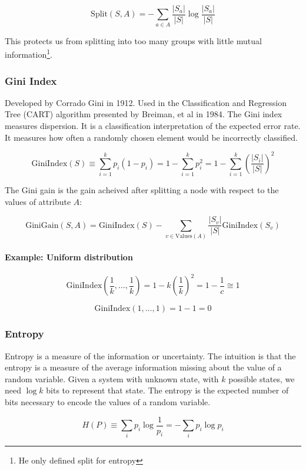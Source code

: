 \documentclass{idc_msc}
\begin{document}
\[\text{Split}(S,A) = - \sum_{a \in A} \frac{|S_a|}{|S|} \log \frac{|S_a|}{|S|}\]

This protects us from splitting into too many groups with little mutual information\footnote{He only defined split for entropy}.

\subsubsection{Gini Index}

Developed by Corrado Gini in 1912.
Used in the Classification and Regression Tree (CART) algorithm presented by Breiman, et al in 1984.
The Gini index measures dispersion.
It is a classification interpretation of the expected error rate.
It measures how often a randomly chosen element would be incorrectly classified.

\[\text{GiniIndex}(S) \equiv \sum_{i=1}^k p_i(1-p_i) = 1 - \sum_{i=1}^k p_i^2 = 1 - \sum_{i=1}^k \left(\frac{|S_i|}{|S|}\right)^2 \]

The Gini gain is the gain acheived after splitting a node with respect to the values of attribute \(A\):

\[\text{GiniGain}(S,A) = \text{GiniIndex}(S) - \sum_{v \in \text{Values}(A)} \frac{|S_v|}{|S|} \text{GiniIndex}(S_v)\]

\paragraph{Example: Uniform distribution}

\[\text{GiniIndex}\left(\frac{1}{k}, \ldots, \frac{1}{k}\right) = 1 - k\left(\frac{1}{k}\right)^2 = 1 - \frac{1}{c} \cong 1\]

\[\text{GiniIndex}\left(1, \ldots, 1\right) = 1 - 1 = 0\]

\subsubsection{Entropy}

Entropy is a measure of the information or uncertainty.
The intuition is that the entropy is a measure of the average information missing about the value of a random variable.
Given a system with unknown state, with \(k\) possible states, we need \(\log k\) bits to represent that state.
The entropy is the expected number of bits necessary to encode the values of a random variable.

\[H(P) \equiv \sum_i p_i \log \frac{1}{p_i} = - \sum_i p_i \log p_i\]
\end{document}
